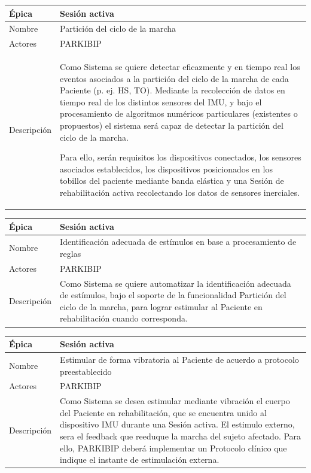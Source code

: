 \begin{table}[H] 
\centering
\begin{tabular}{| p{2cm} | p{10cm} |}
\hline
Épica & Sesión activa\\ \hline
Nombre & Partición del ciclo de la marcha\\ \hline
Actores & PARKIBIP\\ \hline
Descripción & Como Sistema se quiere detectar eficazmente y en tiempo real los eventos asociados a la partición del ciclo de la marcha de cada Paciente (p. ej. HS, TO). Mediante la recolección de datos en tiempo real de los distintos sensores del IMU, y bajo el procesamiento de algoritmos numéricos particulares (existentes o propuestos) el sistema será capaz de detectar la partición del ciclo de la marcha. 

Para ello, serán requisitos los dispositivos conectados, los sensores asociados establecidos, los dispositivos posicionados en los tobillos del paciente mediante banda elástica y una Sesión de rehabilitación activa recolectando los datos de sensores inerciales.  \\ \hline
\end{tabular}
\end{table}

\begin{table}[H] 
\centering
\begin{tabular}{| p{2cm} | p{10cm} |}
\hline
Épica & Sesión activa\\ \hline
Nombre & Identificación adecuada de estímulos en base a procesamiento de reglas\\ \hline
Actores & PARKIBIP\\ \hline
Descripción & Como Sistema se quiere automatizar la identificación adecuada de estímulos, bajo el soporte de la funcionalidad Partición del ciclo de la marcha, para lograr estimular al Paciente en rehabilitación cuando corresponda. \\ \hline
\end{tabular}
\end{table}

\begin{table}[H] 
\centering
\begin{tabular}{| p{2cm} | p{10cm} |}
\hline
Épica & Sesión activa\\ \hline
Nombre & Estimular de forma vibratoria al Paciente de acuerdo a protocolo preestablecido\\ \hline
Actores & PARKIBIP\\ \hline
Descripción &  Como Sistema se desea estimular mediante vibración el cuerpo del Paciente en rehabilitación, que se encuentra unido al dispositivo IMU durante una Sesión activa. El estimulo externo, sera el feedback que reeduque la marcha del sujeto afectado. Para ello, PARKIBIP deberá implementar un Protocolo clínico que indique el instante de estimulación externa.\\ \hline
\end{tabular}
\end{table}

